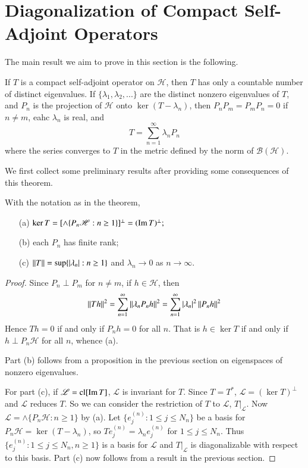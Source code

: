 \section{Diagonalization of Compact Self-Adjoint Operators}
\label{sec:diag}

The main result we aim to prove in this section is the following.

\begin{thm}\label{thm:DiagCompSelfAdj}
    If $T$ is a compact self-adjoint operator on $\mathscr{H}$, then $T$ has only a countable number of distinct eigenvalues. If $\{\lambda_1,\lambda_2,...\}$ are the distinct nonzero eigenvalues of $T$, and $P_n$ is the projection of $\mathscr{H}$ onto $\ker(T-\lambda_n)$, then $P_nP_m = P_mP_n = 0$ if $n \neq m$, eahc $\lambda_n$ is real, and $$T = \sum_{n=1}^{\infty}\lambda_nP_n$$
    where the series converges to $T$ in the metric defined by the norm of $\mathscr{B}(\mathscr{H})$.
\end{thm}

We first collect some preliminary results after providing some consequences of this theorem.

\begin{cor}
    With the notation as in the theorem, \begin{enumerate}
        \item[(a)] $\ker T = [\land \{P_n\mathscr{H}:n\geq 1\}]^{\perp} = (\operatorname{Im} T)^{\perp};$
        \item[(b)] each $P_n$ has finite rank;
        \item[(c)] $\left|\left| T\right|\right| = \sup\{|\lambda_n|:n\geq 1\}$ and $\lambda_n\rightarrow 0$ as $n\rightarrow \infty$.
    \end{enumerate}
\end{cor}
\begin{proof}
    Since $P_n \perp P_m$ for $n \neq m$, if $h \in \mathscr{H}$, then $$\left|\left| Th\right|\right|^2 = \sum_{n=1}^{\infty}\left|\left| \lambda_nP_nh\right|\right|^2 = \sum_{n=1}^{\infty}|\lambda_n|^2\left|\left| P_nh\right|\right|^2$$
    Hence $Th = 0$ if and only if $P_nh = 0$ for all $n$. That is $h \in \ker T$ if and only if $h \perp P_n\mathscr{H}$ for all $n$, whence (a).

    Part (b) follows from a proposition in the previous section on eigenspaces of nonzero eigenvalues.

    For part (c), if $\mathscr{L} = \text{cl}[\operatorname{Im} T]$, $\mathscr{L}$ is invariant for $T$. Since $T = T^*$, $\mathscr{L} = (\ker T)^{\perp}$ and $\mathscr{L}$ reduces $T$. So we can consider the restriction of $T$ to $\mathscr{L}$, $T\vert_{\mathscr{L}}$. Now $\mathscr{L} = \land\{P_n\mathscr{H}:n\geq 1\}$ by (a). Let $\{e_j^{(n)}:1\leq j \leq N_n\}$ be a basis for $P_n\mathscr{H} = \ker(T-\lambda_n)$, so $Te_j^{(n)} = \lambda_ne_j^{(n)}$ for $1 \leq j \leq N_n$. Thus $\{e_j^{(n)}:1\leq j \leq N_n, n\geq 1\}$ is a basis for $\mathscr{L}$ and $T\vert_{\mathscr{L}}$ is diagonalizable with respect to this basis. Part (c) now follows from a result in the previous section.
\end{proof}

